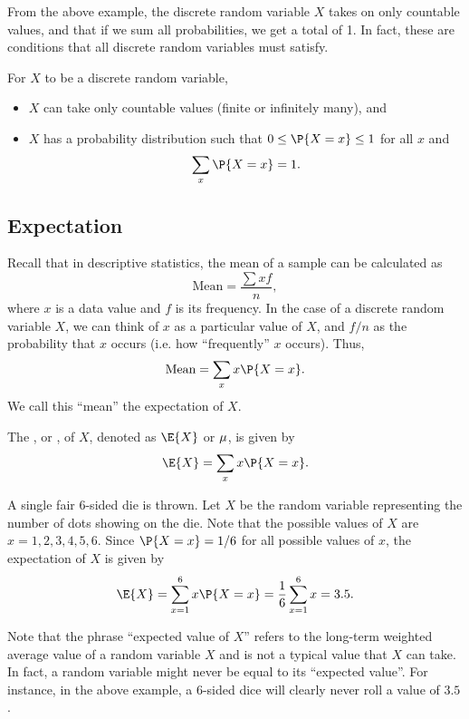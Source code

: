 From the above example, the discrete random variable $X$ takes on only countable values, and that if we sum all probabilities, we get a total of 1. In fact, these are conditions that all discrete random variables must satisfy.

\begin{condition}
    For $X$ to be a discrete random variable,
    \begin{itemize}
        \item $X$ can take only countable values (finite or infinitely many), and
        \item $X$ has a probability distribution such that $0 \leq \P{X = x} \leq 1$ for all $x$ and \[\sum_{x} \P{X = x} = 1.\]
    \end{itemize}
\end{condition}

\subsection{Expectation}\label{ssec:DRV-Exp}

Recall that in descriptive statistics, the mean of a sample can be calculated as \[\text{Mean} = \frac{\sum xf}{n},\] where $x$ is a data value and $f$ is its frequency. In the case of a discrete random variable $X$, we can think of $x$ as a particular value of $X$, and $f/n$ as the probability that $x$ occurs (i.e. how ``frequently'' $x$ occurs). Thus, \[\text{Mean} = \sum_{x} x \P{X = x}.\] We call this ``mean'' the expectation of $X$.

\begin{definition}
    The , or , of $X$, denoted as $\E{X}$ or $\mu$, is given by \[\E{X} = \sum_{x} x \P{X = x}.\]
\end{definition}

\begin{example}[Expectation]
    A single fair 6-sided die is thrown. Let $X$ be the random variable representing the number of dots showing on the die. Note that the possible values of $X$ are $x = 1, 2, 3, 4, 5, 6$. Since $\P{X = x} = 1/6$ for all possible values of $x$, the expectation of $X$ is given by \[\E{X} = \sum_{x = 1}^6 x\P{X = x} = \frac16 \sum_{x= 1}^6 x = 3.5.\]
\end{example}

Note that the phrase ``expected value of $X$'' refers to the long-term weighted average value of a random variable $X$ and is not a typical value that $X$ can take. In fact, a random variable might never be equal to its ``expected value''. For instance, in the above example, a 6-sided dice will clearly never roll a value of $3.5$.

